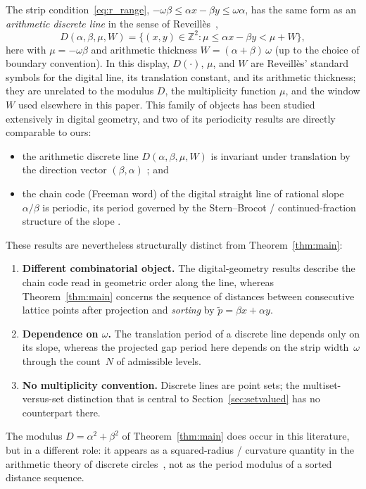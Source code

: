 \documentclass[11pt,reqno]{amsart}
\theoremstyle{plain}
\theoremstyle{definition}
\theoremstyle{remark}
\begin{document}
The strip condition~\eqref{eq:r_range},
\(-\omega\beta \le \alpha x - \beta y \le \omega\alpha\), has the same form as
an \emph{arithmetic discrete line} in the sense of
Reveill\`{e}s~\cite{Reveilles1991},
\[
    D(\alpha,\beta,\mu,W)
    = \bigl\{(x,y)\in\mathbb{Z}^2 : \mu \le \alpha x - \beta y < \mu + W\bigr\},
\]
here with \(\mu = -\omega\beta\) and arithmetic thickness
\(W = (\alpha+\beta)\,\omega\) (up to the choice of boundary convention).
In this display, \(D(\cdot)\), \(\mu\), and \(W\) are Reveill\`{e}s'
standard symbols for the digital line, its translation constant, and its
arithmetic thickness; they are unrelated to the modulus \(D\), the
multiplicity function \(\mu\), and the window \(W\) used elsewhere in
this paper.
This family of objects has been studied extensively in digital geometry, and
two of its periodicity results are directly comparable to ours:
\begin{itemize}
    \item the arithmetic discrete line \(D(\alpha,\beta,\mu,W)\) is invariant
          under translation by the direction vector \((\beta,\alpha)\)
          \cite{Reveilles1991}; and
    \item the chain code (Freeman word) of the digital straight line of
          rational slope \(\alpha/\beta\) is periodic, its period governed by
          the Stern--Brocot / continued-fraction structure of the slope
          \cite{LachaudSaid2013, BerstelEtAl2008}.
\end{itemize}

These results are nevertheless structurally distinct from
Theorem~\ref{thm:main}:
\begin{enumerate}
    \item \textbf{Different combinatorial object.} The digital-geometry
          results describe the chain code read in geometric order along the
          line, whereas Theorem~\ref{thm:main} concerns the sequence of
          distances between consecutive lattice points after projection and
          \emph{sorting} by \(\tilde{p} = \beta x + \alpha y\).
    \item \textbf{Dependence on \(\omega\).} The translation period of a
          discrete line depends only on its slope, whereas the projected gap
          period here depends on the strip width~\(\omega\) through the
          count~\(N\) of admissible levels.
    \item \textbf{No multiplicity convention.} Discrete lines are point sets;
          the multiset-versus-set distinction that is central to
          Section~\ref{sec:setvalued} has no counterpart there.
\end{enumerate}
The modulus \(D = \alpha^2+\beta^2\) of Theorem~\ref{thm:main} does occur in
this literature, but in a different role: it appears as a squared-radius /
curvature quantity in the arithmetic theory of discrete
circles~\cite{FiorioJametToutant2006}, not as the period modulus of a sorted
distance sequence.
\end{document}
